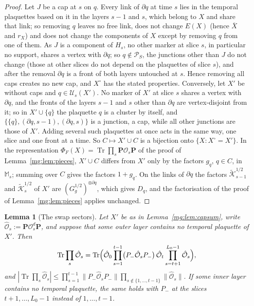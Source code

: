 \documentclass[11pt,a4paper]{article}
\newtheorem{lemma}[theorem]{Lemma}
\theoremstyle{definition}
\theoremstyle{remark}
\DeclareMathOperator{\Tr}{Tr}
\newcommand{\cP}{\mathcal{P}}
\newcommand{\norm}[1]{\lVert #1\rVert}
\begin{document}
\begin{proof}
Let $J$ be a cap at $s$ on $q$. Every link of $\partial q$ at time $s$ lies in the temporal plaquettes based on it in the layers $s-1$ and $s$, which
belong to $X$ and share that link; so removing $q$ leaves no free link, does not change $E(X)$ (hence $\overline X$ and $r_X$) and does not change the
components of $X$ except by removing $q$ from one of them. As $J$ is a component of $H_s$, no other marker at slice $s$, in particular no support, shares a
vertex with $\partial q$; so $q\notin\cP_S$, the junctions other than $J$ do not change (those at other slices do not depend on the plaquettes of
slice $s$), and after the removal $\partial q$ is a front of both layers untouched at $s$. Hence removing all caps creates no new cap, and $X^\circ$
has the stated properties. Conversely, let $X'$ be without caps and $q\in\mathcal U_s(X')$. No marker of $X'$ at slice $s$ shares a vertex with
$\partial q$, and the fronts of the layers $s-1$ and $s$ other than $\partial q$ are vertex-disjoint from it; so in $X'\cup\{q\}$ the plaquette $q$ is a
cluster by itself, and $\{\{q\},(\partial q,s-1),(\partial q,s)\}$ is a junction, a cap, while all other junctions are those of $X'$. Adding several such
plaquettes at once acts in the same way, one slice and one front at a time. So $C\mapsto X'\cup C$ is a bijection onto $\{X:X^\circ=X'\}$. In the
representation $\Phi_F(X)=\Tr\prod_s\mathbf P\mathcal O_s\mathbf P$ of the proof of Lemma~\ref{mg:lem:pieces}, $X'\cup C$ differs from $X'$ only by the
factors $g_q$, $q\in C$, in $\mathbb M_s$; summing over $C$ gives the factors $1+g_q$. On the links of $\partial q$ the factors
$\tilde{\mathcal K}^{1/2}_{s-1}$ and $\tilde{\mathcal K}^{1/2}_s$ of $X'$ are $(G_g^{1/2})^{\otimes\partial q}$, which gives $D_q$, and the factorisation of the proof of
Lemma~\ref{mg:lem:pieces} applies unchanged.
\end{proof}

\begin{lemma}[The swap sectors]\label{mg:lem:swap}
Let $X'$ be as in Lemma~\ref{mg:lem:capsum}, write $\hat{\mathcal O}_s:=\mathbf P\mathcal O^d_s\mathbf P$, and suppose that some outer layer contains no temporal
plaquette of $X'$. Then
\[
\Tr\prod_s\hat{\mathcal O}_s=\Tr\Bigl(\hat{\mathcal O}_0\prod_{s=1}^{t-1}\bigl(P_-\hat{\mathcal O}_sP_-\bigr)\,\hat{\mathcal O}_t\prod_{s=t+1}^{L_0-1}\hat{\mathcal O}_s\Bigr),
\]
and $|\Tr\prod_s\hat{\mathcal O}_s|\le\prod_{s=1}^{t-1}\norm{P_-\hat{\mathcal O}_sP_-}\prod_{s\notin\{1,\dots,t-1\}}\norm{\hat{\mathcal O}_s}$. If some inner layer contains no
temporal plaquette, the same holds with $P_-$ at the slices $t+1,\dots,L_0-1$ instead of $1,\dots,t-1$.
\end{lemma}
\end{document}
